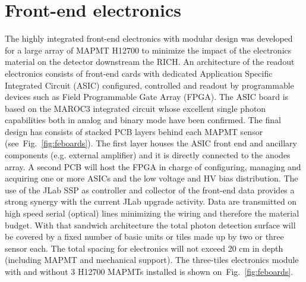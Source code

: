 \section*{Front-end electronics}

The highly integrated front-end electronics with modular design was developed for a large array of MAPMT H12700 to minimize the impact of the electronics material on the detector downstream the RICH.
An architecture of the readout electronics consists of front-end cards with dedicated Application Specific Integrated Circuit (ASIC) configured, controlled and readout by programmable devices such as Field Programmable Gate Array (FPGA).
The ASIC board is based on the MAROC3 integrated circuit whose excellent single photon capabilities both in analog and binary mode have been confirmed.
The final design has consists of stacked PCB layers behind each MAPMT sensor (see~Fig.~\ref{fig:feboards}).
The first layer houses the ASIC front end and ancillary components (e.g. external amplifier) and it is directly connected to the anodes array.
A second PCB will host the FPGA in charge of configuring, managing and acquiring one or more ASICs and the low voltage and HV bias distribution.
The use of the JLab SSP as controller and collector of the front-end data provides a strong synergy with the current JLab upgrade activity.
Data are transmitted on high speed serial (optical) lines minimizing the wiring and therefore the material budget.
With that sandwich architecture the total photon detection surface will be covered by a fixed number of basic units or tiles made up by two or three sensor each.
The total spacing for electronics will not exceed 20 cm in depth (including MAPMT and mechanical support).
The three-tiles electronics module with and without 3 H12700 MAPMTs installed is shown on~Fig.~\ref{fig:feboards}.

